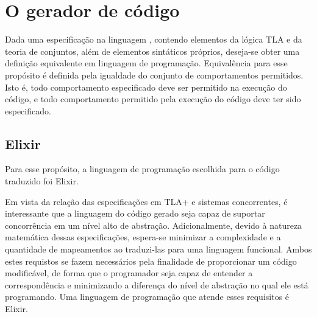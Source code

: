 \chapter{O gerador de código}
\label{cap3}

Dada uma especificação na linguagem \TLA, contendo elementos da lógica TLA e da teoria de conjuntos, além de elementos sintáticos próprios, deseja-se obter uma definição equivalente em linguagem de programação. Equivalência para esse propósito é definida pela igualdade do conjunto de comportamentos permitidos. Isto é, todo comportamento especificado deve ser permitido na execução do código, e todo comportamento permitido pela execução do código deve ter sido especificado.

\section{Elixir}

Para esse propósito, a linguagem de programação escolhida para o código traduzido foi Elixir.

Em vista da relação das especificações em TLA+ e sistemas concorrentes, é interessante que a linguagem do código gerado seja capaz de suportar concorrência em um nível alto de abstração. Adicionalmente, devido à natureza matemática dessas especificações, espera-se minimizar a complexidade e a quantidade de mapeamentos ao traduzi-las para uma linguagem funcional. Ambos estes requistos se fazem necessários pela finalidade de proporcionar um código modificável, de forma que o programador seja capaz de entender a correspondência e minimizando a diferença do nível de abstração no qual ele está programando. Uma linguagem de programação que atende esses requisitos é Elixir.
